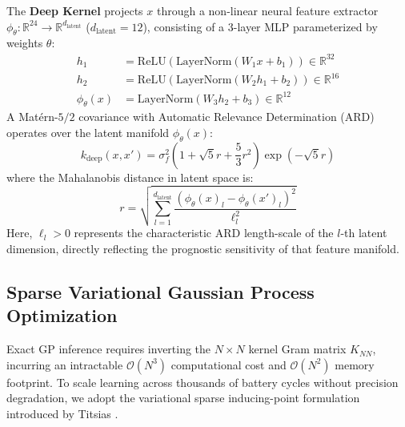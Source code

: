 \documentclass[a4paper,fleqn]{cas-sc}
\begin{document}
The \textbf{Deep Kernel} projects $x$ through a non-linear neural feature extractor $\phi_\theta : \mathbb{R}^{24} \to \mathbb{R}^{d_{\text{latent}}}$ ($d_{\text{latent}}=12$), consisting of a 3-layer MLP parameterized by weights $\theta$:
\begin{align}
    h_1 &= \text{ReLU}(\text{LayerNorm}(W_1 x + b_1)) \in \mathbb{R}^{32} \\
    h_2 &= \text{ReLU}(\text{LayerNorm}(W_2 h_1 + b_2)) \in \mathbb{R}^{16} \\
    \phi_\theta(x) &= \text{LayerNorm}(W_3 h_2 + b_3) \in \mathbb{R}^{12}
\end{align}
A Matérn-$5/2$ covariance with Automatic Relevance Determination (ARD) operates over the latent manifold $\phi_\theta(x)$:
\begin{equation}
    k_{\text{deep}}(x, x') = \sigma_f^2 \left(1 + \sqrt{5} r + \frac{5}{3} r^2 \right) \exp\left(-\sqrt{5} r\right)
\end{equation}
where the Mahalanobis distance in latent space is:
\begin{equation}
    r = \sqrt{\sum_{l=1}^{d_{\text{latent}}} \frac{(\phi_\theta(x)_l - \phi_\theta(x')_l)^2}{\ell_l^2}}
\end{equation}
Here, $\ell_l > 0$ represents the characteristic ARD length-scale of the $l$-th latent dimension, directly reflecting the prognostic sensitivity of that feature manifold.

\subsection{Sparse Variational Gaussian Process Optimization}
Exact GP inference requires inverting the $N \times N$ kernel Gram matrix $K_{NN}$, incurring an intractable $\mathcal{O}(N^3)$ computational cost and $\mathcal{O}(N^2)$ memory footprint. To scale learning across thousands of battery cycles without precision degradation, we adopt the variational sparse inducing-point formulation introduced by Titsias \cite{titsias2009variational}.
\end{document}
